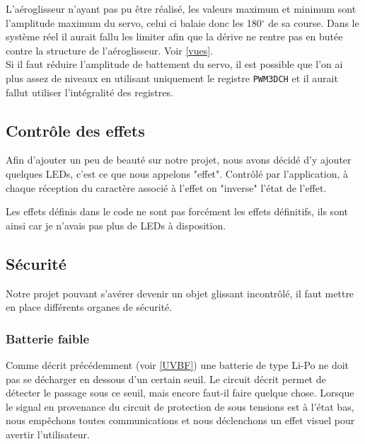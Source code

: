 				\begin{tcolorbox}[center,width=0.9\textwidth, colframe=red!90!orange, colback=orange!25, arc=3mm,boxrule=1mm, sharp corners=east,title=Note]
			L'aéroglisseur n'ayant pas pu être réalisé, les valeurs maximum et minimum sont l'amplitude maximum du servo, celui ci balaie donc les 180$^\circ$ de sa course. Dans le système réel il aurait fallu les limiter afin que la dérive ne rentre pas en butée contre la structure de l'aéroglisseur. Voir \ref{vues}.\\
			Si il faut réduire l'amplitude de battement du servo, il est possible que l'on ai plus assez de niveaux en utilisant uniquement le registre \texttt{PWM3DCH} et il aurait fallut utiliser l'intégralité des registres.
  			\end{tcolorbox}
			
			\subsection{Contrôle des effets}
			Afin d'ajouter un peu de beauté sur notre projet, nous avons décidé d'y ajouter quelques LEDs, c'est ce que nous appelons "effet". Contrôlé par l'application, à chaque réception du caractère associé à l'effet on "inverse" l'état de l'effet.
			\begin{tcolorbox}[center,width=0.9\textwidth, colframe=red!90!orange, colback=orange!25, arc=3mm,boxrule=1mm, sharp corners=east,title=Note]
			Les effets définis dans le code ne sont pas forcément les effets définitifs, ils sont ainsi car je n'avais pas plus de LEDs à disposition.
  			\end{tcolorbox}
			
			\subsection{Sécurité}\label{secu}
			Notre projet pouvant s'avérer devenir un objet glissant incontrôlé, il faut mettre en place différents organes de sécurité.
			
				\subsubsection{Batterie faible}
				Comme décrit précédemment (voir \ref{UVBF}) une batterie de type Li-Po ne doit pas se décharger en dessous d'un certain seuil. Le circuit décrit permet de détecter le passage sous ce seuil, mais encore faut-il faire quelque chose. Lorsque le signal en provenance du circuit de protection de sous tensions est à l'état bas, nous empêchons toutes communications et nous déclenchons un effet visuel pour avertir l'utilisateur.
